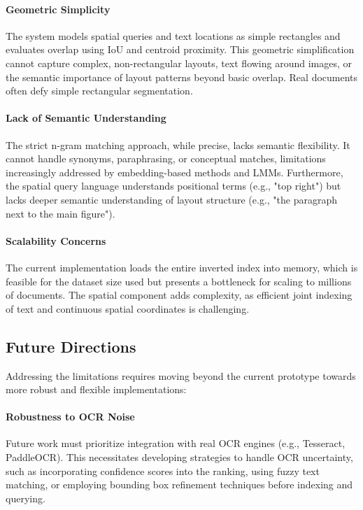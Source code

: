 \documentclass[manuscript,screen]{acmart}
\begin{document}
\paragraph{Geometric Simplicity}
The system models spatial queries and text locations as simple rectangles and evaluates overlap using IoU and centroid proximity. This geometric simplification cannot capture complex, non-rectangular layouts, text flowing around images, or the semantic importance of layout patterns beyond basic overlap. Real documents often defy simple rectangular segmentation.

\paragraph{Lack of Semantic Understanding}
The strict n-gram matching approach, while precise, lacks semantic flexibility. It cannot handle synonyms, paraphrasing, or conceptual matches, limitations increasingly addressed by embedding-based methods and LMMs. Furthermore, the spatial query language understands positional terms (e.g., "top right") but lacks deeper semantic understanding of layout structure (e.g., "the paragraph next to the main figure").

\paragraph{Scalability Concerns}
The current implementation loads the entire inverted index into memory, which is feasible for the dataset size used but presents a bottleneck for scaling to millions of documents. The spatial component adds complexity, as efficient joint indexing of text and continuous spatial coordinates is challenging.

\subsection{Future Directions}

Addressing the limitations requires moving beyond the current prototype towards more robust and flexible implementations:

\paragraph{Robustness to OCR Noise}
Future work must prioritize integration with real OCR engines (e.g., Tesseract, PaddleOCR). This necessitates developing strategies to handle OCR uncertainty, such as incorporating confidence scores into the ranking, using fuzzy text matching, or employing bounding box refinement techniques before indexing and querying.
\end{document}
